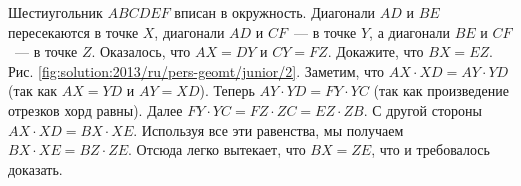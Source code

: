 \problem
Шестиугольник $ABCDEF$ вписан в окружность.
Диагонали $AD$ и $BE$ пересекаются в точке $X$, диагонали $AD$ и $CF$~--- в
точке $Y$, а диагонали $BE$ и $CF$~--- в точке $Z$.
Оказалось, что $AX = DY$ и $CY = FZ$.
Докажите, что $BX = EZ$.
%
\label{solution:2013/ru/pers-geomt/junior/2}
Рис. \ref{fig:solution:2013/ru/pers-geomt/junior/2}.
Заметим, что $AX \cdot XD = AY \cdot YD$ (так как $AX=YD$ и $AY=XD$).
Теперь $AY \cdot YD = FY \cdot YC$ (так как произведение отрезков хорд равны).
Далее $FY \cdot YC = FZ \cdot ZC = EZ \cdot ZB$.
С другой стороны $AX \cdot XD = BX \cdot XE$.
Используя все эти равенства, мы получаем $BX \cdot XE = BZ \cdot ZE$.
Отсюда легко вытекает, что $BX = ZE$, что и требовалось доказать.
\endproblem
